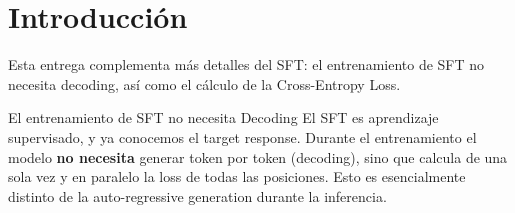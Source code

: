 \section{Introducción}
Esta entrega complementa más detalles del SFT: el entrenamiento de SFT no necesita decoding, así como el cálculo de la Cross-Entropy Loss.

\begin{importantbox}{El entrenamiento de SFT no necesita Decoding}
El SFT es aprendizaje supervisado, y ya conocemos el target response. Durante el entrenamiento el modelo \textbf{no necesita} generar token por token (decoding), sino que calcula de una sola vez y en paralelo la loss de todas las posiciones. Esto es esencialmente distinto de la auto-regressive generation durante la inferencia.
\end{importantbox}

